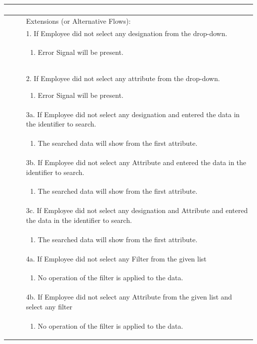 \documentclass[12pt,a4paper]{article}
\begin{document}
\begin{longtable}{| p{3cm}|p{12cm}|}
\begin{enumerate}
\end{enumerate}\\ \hline

&Extensions (or Alternative Flows):\\

& 1. If Employee did not select any designation from the drop-down. \\
& \begin{enumerate}
		\item Error Signal will be present.
	\end{enumerate}
\\ 

      & 2. If Employee did not select any attribute from the drop-down.
 	\begin{enumerate}
		\item Error Signal will be present.
	\end{enumerate}
\\ 
& 3a. If Employee did not select any designation and entered the data in the identifier to search. \\
& \begin{enumerate}
		\item The searched data will show from the first attribute.
	\end{enumerate}
\\
& 3b. If Employee did not select any Attribute and entered the data in the identifier to search. \\
& \begin{enumerate}
		\item The searched data will show from the first attribute.
	\end{enumerate}
\\ 
& 3c. If Employee did not select any designation and  Attribute and entered the data in the identifier to search. \\
& \begin{enumerate}
		\item The searched data will show from the first attribute.
	\end{enumerate}
\\ 

& 4a. If Employee did not select any Filter from the given list \\
& \begin{enumerate}
		\item No operation of the filter is applied to the data.
	\end{enumerate}
\\ 
& 4b. If Employee did not select any Attribute from the given list and select any filter  \\
& \begin{enumerate}
		\item No operation of the filter is applied to the data.
	\end{enumerate}
\\ 


\end{longtable}
\end{document}
